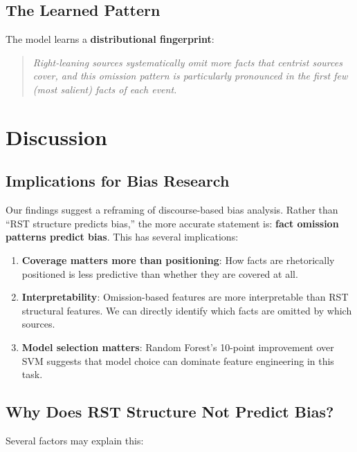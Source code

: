\documentclass[11pt]{article}
\begin{document}
\subsection{The Learned Pattern}

The model learns a \textbf{distributional fingerprint}:

\begin{quote}
\textit{Right-leaning sources systematically omit more facts that centrist sources cover, and this omission pattern is particularly pronounced in the first few (most salient) facts of each event.}
\end{quote}


\section{Discussion}

\subsection{Implications for Bias Research}

Our findings suggest a reframing of discourse-based bias analysis. Rather than ``RST structure predicts bias,'' the more accurate statement is: \textbf{fact omission patterns predict bias}. This has several implications:

\begin{enumerate}
    \item \textbf{Coverage matters more than positioning}: How facts are rhetorically positioned is less predictive than whether they are covered at all.
    
    \item \textbf{Interpretability}: Omission-based features are more interpretable than RST structural features. We can directly identify which facts are omitted by which sources.
    
    \item \textbf{Model selection matters}: Random Forest's 10-point improvement over SVM suggests that model choice can dominate feature engineering in this task.
\end{enumerate}

\subsection{Why Does RST Structure Not Predict Bias?}

Several factors may explain this:
\end{document}
